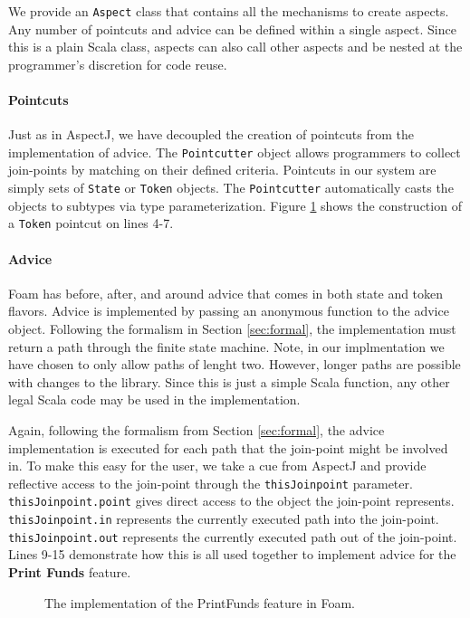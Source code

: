 \documentclass[sigplan,anonymous,review]{acmart}
\begin{document}
We provide an \texttt{Aspect} class that contains all the mechanisms to create aspects. Any number of pointcuts and advice can be defined within a single aspect. Since this is a plain Scala class, aspects can also call other aspects and be nested at the programmer's discretion for code reuse.

\paragraph{Pointcuts} Just as in AspectJ, we have decoupled the creation of pointcuts from the implementation of advice. The \texttt{Pointcutter} object allows programmers to collect join-points by matching on their defined criteria. Pointcuts in our system are simply sets of \texttt{State} or \texttt{Token} objects. The \texttt{Pointcutter} automatically casts the objects to subtypes via type parameterization. Figure \ref{lst:PrintFunds} shows the construction of a \texttt{Token} pointcut on lines 4-7.

\paragraph{Advice} Foam has before, after, and around advice that comes in both state and token flavors. Advice is implemented by passing an anonymous function to the advice object. Following the formalism in Section \ref{sec:formal}, the implementation must return a path through the finite state machine. Note, in our implmentation we have chosen to only allow paths of lenght two. However, longer paths are possible with changes to the library. Since this is just a simple Scala function, any other legal Scala code may be used in the implementation. 

Again, following the formalism from Section \ref{sec:formal}, the advice implementation is executed for each path that the join-point might be involved in. To make this easy for the user, we take a cue from AspectJ and provide reflective access to the join-point through the \texttt{thisJoinpoint} parameter. \texttt{thisJoinpoint.point} gives direct access to the object the join-point represents. \texttt{thisJoinpoint.in} represents the currently executed path into the join-point. \texttt{thisJoinpoint.out} represents the currently executed path out of the join-point. Lines 9-15 demonstrate how this is all used together to implement advice for the \textbf{Print Funds} feature.

\begin{figure}[h]
    \centering
    
    \caption{The implementation of the PrintFunds feature in Foam.}
    \label{lst:PrintFunds}
\end{figure}
\end{document}
